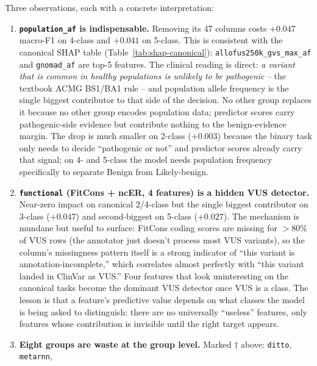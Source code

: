 \documentclass[11pt,a4paper]{article}
\begin{document}
Three observations, each with a concrete interpretation:

\begin{enumerate}[leftmargin=*]
    \item \textbf{\texttt{population\_af} is indispensable.} Removing
          its 47 columns costs $+0.047$ macro-F1 on 4-class and $+0.041$
          on 5-class. This is consistent with the canonical SHAP table
          (Table~\ref{tab:shap-canonical}): \texttt{allofus250k\_gvs\_max\_af}
          and \texttt{gnomad\_af} are top-5 features. The clinical reading
          is direct: \emph{a variant that is common in healthy populations
          is unlikely to be pathogenic} -- the textbook ACMG BS1/BA1 rule
          -- and population allele frequency is the single biggest
          contributor to that side of the decision. No other group
          replaces it because no other group encodes population data;
          predictor scores carry pathogenic-side evidence but contribute
          nothing to the benign-evidence margin. The drop is much smaller
          on 2-class ($+0.003$) because the binary task only needs to
          decide ``pathogenic or not'' and predictor scores already
          carry that signal; on 4- and 5-class the model needs population
          frequency specifically to separate Benign from Likely-benign.
    \item \textbf{\texttt{functional} (FitCons + ncER, 4 features) is
          a hidden VUS detector.} Near-zero impact on canonical 2/4-class
          but the single biggest contributor on 3-class ($+0.047$) and
          second-biggest on 5-class ($+0.027$). The mechanism is mundane
          but useful to surface: FitCons coding scores are missing for
          $>80\%$ of VUS rows (the annotator just doesn't process
          most VUS variants), so the column's missingness pattern itself
          is a strong indicator of ``this variant is annotation-incomplete,''
          which correlates almost perfectly with ``this variant landed in
          ClinVar as VUS.'' Four features that look uninteresting on the
          canonical tasks become the dominant VUS detector once VUS is a
          class. The lesson is that a feature's predictive value depends
          on what classes the model is being asked to distinguish: there
          are no universally ``useless'' features, only features whose
          contribution is invisible until the right target appears.
    \item \textbf{Eight groups are waste at the group level.} Marked
          $\dagger$ above: \texttt{ditto}, \texttt{metarnn},

\end{enumerate}
\end{document}
